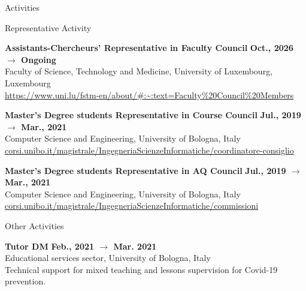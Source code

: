 \documentclass{resume} %
\begin{document}


    \begin{rSection}{Activities}


        \begin{rSubsection2}{Representative Activity}
            \item\textbf{Assistants-Chercheurs' Representative in Faculty Council }\hfill \textbf{Oct., 2026 $\rightarrow$ Ongoing}
            \\Faculty of Science, Technology and Medicine, University of Luxembourg, Luxembourg
            \\\url{https://www.uni.lu/fstm-en/about/#:~:text=Faculty%20Council%20Members}
            \item\textbf{ Master's Degree students Representative in Course Council }\hfill \textbf{Jul., 2019 $\rightarrow$ Mar., 2021}
            \\Computer Science and Engineering, University of Bologna, Italy
            \\\url{corsi.unibo.it/magistrale/IngegneriaScienzeInformatiche/coordinatore-consiglio}
            \item\textbf{ Master's Degree students Representative in AQ Council }\hfill \textbf{Jul., 2019 $\rightarrow$ Mar., 2021}
            \\Computer Science and Engineering, University of Bologna, Italy
            \\\url{corsi.unibo.it/magistrale/IngegneriaScienzeInformatiche/commissioni}
        \end{rSubsection2}


        \begin{rSubsection2}{Other Activities}
            \item\textbf{ Tutor DM }\hfill \textbf{Feb., 2021 $\rightarrow$ Mar. 2021}
            \\Educational services sector, University of Bologna, Italy
            \\Technical support for mixed teaching and lessons supervision for Covid-19 prevention.
        \end{rSubsection2}

    \end{rSection}
\end{document}
